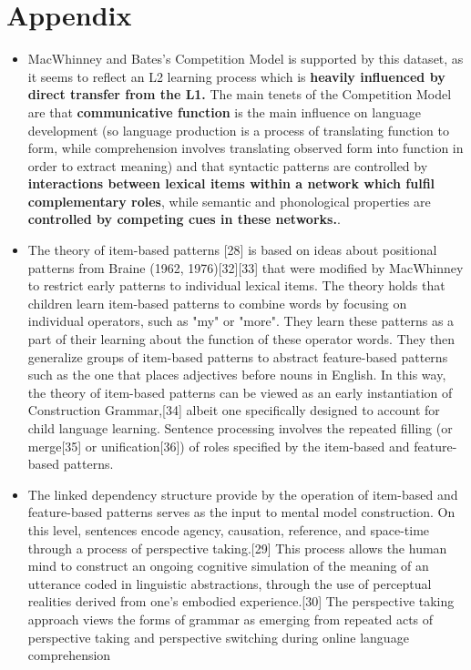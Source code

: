 \documentclass{article}
\begin{document}
\section{Appendix}
\begin{itemize}
    \subsection{The Competition Model}
    \item MacWhinney and Bates’s Competition Model is supported by this dataset, as it seems to reflect an L2 learning process which is \textbf{heavily influenced by direct transfer from the L1.} The main tenets of the Competition Model are that \textbf{communicative function} is the main influence on language development (so language production is a process of translating function to form, while comprehension involves translating observed form into function in order to extract meaning) and that syntactic patterns are controlled by \textbf{interactions between lexical items within a network which fulfil complementary roles}, while semantic and phonological properties are \textbf{controlled by competing cues in these networks.}.
    \item The theory of item-based patterns [28] is based on ideas about positional patterns from Braine (1962, 1976)[32][33] that were modified by MacWhinney to restrict early patterns to individual lexical items. The theory holds that children learn item-based patterns to combine words by focusing on individual operators, such as "my" or "more". They learn these patterns as a part of their learning about the function of these operator words. They then generalize groups of item-based patterns to abstract feature-based patterns such as the one that places adjectives before nouns in English. In this way, the theory of item-based patterns can be viewed as an early instantiation of Construction Grammar,[34] albeit one specifically designed to account for child language learning. Sentence processing involves the repeated filling (or merge[35] or unification[36]) of roles specified by the item-based and feature-based patterns. 
    \item The linked dependency structure provide by the operation of item-based and feature-based patterns serves as the input to mental model construction. On this level, sentences encode agency, causation, reference, and space-time through a process of perspective taking.[29] This process allows the human mind to construct an ongoing cognitive simulation of the meaning of an utterance coded in linguistic abstractions, through the use of perceptual realities derived from one's embodied experience.[30] The perspective taking approach views the forms of grammar as emerging from repeated acts of perspective taking and perspective switching during online language comprehension

\end{itemize}
\end{document}

